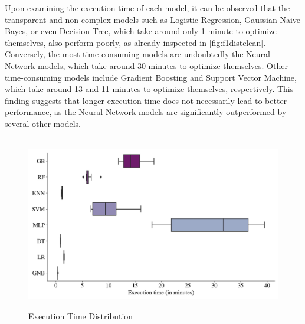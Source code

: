 \newpage
Upon examining the execution time of each model, it can be observed that the transparent and non-complex models such as Logistic Regression, Gaussian Naive Bayes, or even Decision Tree, which take around only 1 minute to optimize themselves, also perform poorly, as already inspected in \autoref{fig:f1distclean}.
Conversely, the most time-consuming models are undoubtedly the Neural Network models, which take around 30 minutes to optimize themselves. Other time-consuming models include Gradient Boosting and Support Vector Machine, which take around 13 and 11 minutes to optimize themselves, respectively.
This finding suggests that longer execution time does not necessarily lead to better performance, as the Neural Network models are significantly outperformed by several other models.
\begin{figure}[H]
\centering
\caption{Execution Time Distribution}\vspace{0.5em}
\label{fig:timedist}\
\includegraphics[width=140mm]{Figures/EXECUTION_TIME_Distribution.jpg}

\vspace{-1em}
\end{figure}

